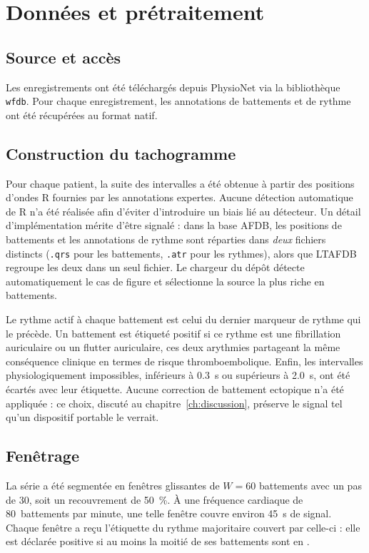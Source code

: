 \section{Données et prétraitement}
\label{sec:meth:donnees}

\subsection{Source et accès}
Les enregistrements ont été téléchargés depuis PhysioNet \cite{goldberger2000physiobank} via la bibliothèque \texttt{wfdb}. Pour chaque enregistrement, les annotations de battements et de rythme ont été récupérées au format natif.

\subsection{Construction du tachogramme}
Pour chaque patient, la suite des intervalles \RR{} a été obtenue à partir des positions d'ondes R fournies par les annotations expertes. Aucune détection automatique de R n'a été réalisée afin d'éviter d'introduire un biais lié au détecteur. Un détail d'implémentation mérite d'être signalé : dans la base AFDB, les positions de battements et les annotations de rythme sont réparties dans \emph{deux} fichiers distincts (\texttt{.qrs} pour les battements, \texttt{.atr} pour les rythmes), alors que LTAFDB regroupe les deux dans un seul fichier. Le chargeur du dépôt détecte automatiquement le cas de figure et sélectionne la source la plus riche en battements.

Le rythme actif à chaque battement est celui du dernier marqueur de rythme qui le précède. Un battement est étiqueté positif si ce rythme est une fibrillation auriculaire ou un flutter auriculaire, ces deux arythmies partageant la même conséquence clinique en termes de risque thromboembolique. Enfin, les intervalles physiologiquement impossibles, inférieurs à \SI{0.3}{\second} ou supérieurs à \SI{2.0}{\second}, ont été écartés avec leur étiquette. Aucune correction de battement ectopique n'a été appliquée : ce choix, discuté au chapitre~\ref{ch:discussion}, préserve le signal tel qu'un dispositif portable le verrait.

\subsection{Fenêtrage}
La série \RR{} a été segmentée en fenêtres glissantes de \(W = 60\) battements avec un pas de 30, soit un recouvrement de 50~\%. À une fréquence cardiaque de 80~battements par minute, une telle fenêtre couvre environ \SI{45}{\second} de signal. Chaque fenêtre a reçu l'étiquette du rythme majoritaire couvert par celle-ci : elle est déclarée positive si au moins la moitié de ses battements sont en \FA{}.

